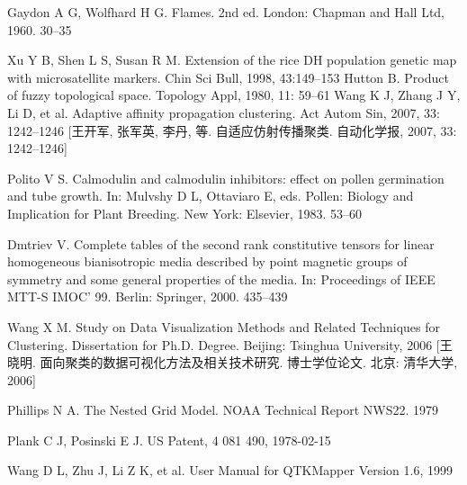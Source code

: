 \documentclass{SCIS2015cn}
\begin{document}
\begin{thebibliography}{99}

Gaydon A G, Wolfhard H G. Flames. 2nd ed. London: Chapman and Hall Ltd, 1960. 30--35

Xu Y B, Shen L S, Susan R M. Extension of the rice DH population genetic map with microsatellite markers. Chin Sci Bull, 1998, 43:149--153
Hutton B. Product of fuzzy topological space. Topology Appl, 1980, 11: 59--61
Wang K J, Zhang J Y, Li D, et al. Adaptive affinity propagation clustering. Act Autom Sin, 2007, 33: 1242--1246 [王开军, 张军英, 李丹, 等. 自适应仿射传播聚类. 自动化学报, 2007, 33: 1242--1246]

Polito V S. Calmodulin and calmodulin inhibitors: effect on pollen germination and tube growth. In: Mulvshy D L, Ottaviaro E, eds. Pollen: Biology and Implication for Plant Breeding. New York: Elsevier, 1983. 53--60

Dmtriev V. Complete tables of the second rank constitutive tensors for linear homogeneous bianisotropic media described by point magnetic groups of symmetry and some general properties of the media. In: Proceedings of IEEE MTT-S IMOC' 99. Berlin: Springer, 2000. 435--439

Wang X M. Study on Data Visualization Methods and Related Techniques for Clustering. Dissertation for Ph.D. Degree. Beijing: Tsinghua University, 2006 [王晓明. 面向聚类的数据可视化方法及相关技术研究. 博士学位论文. 北京: 清华大学, 2006]

Phillips N A. The Nested Grid Model. NOAA Technical Report NWS22. 1979

Plank C J, Posinski E J. US Patent, 4 081 490, 1978-02-15

Wang D L, Zhu J, Li Z K, et al. User Manual for QTKMapper Version 1.6, 1999

\end{thebibliography}
\end{document}
